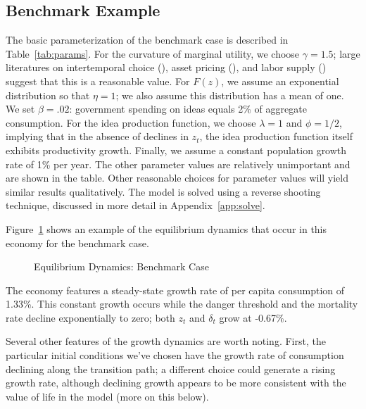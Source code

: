\documentclass[12pt,twoside]{article}
\newcommand{\cnp}[1]{(\citealt{#1})}  %
\begin{document}
\subsection{Benchmark Example}

The basic parameterization of the benchmark case is described in
Table~\ref{tab:params}. For the curvature of marginal utility, we choose
$\gamma=1.5$; large literatures on intertemporal choice \cnp{Hall:IES},
asset pricing \cnp{Lucas:risk}, and labor supply \cnp{Chetty2006}
suggest that this is a reasonable value. For $F(z)$, we assume an
exponential distribution so that $\eta=1$; we also assume this
distribution has a mean of one. We set $\beta=.02$: government spending
on ideas equals 2\% of aggregate consumption. For the idea production
function, we choose $\lambda=1$ and $\phi=1/2$, implying that in the
absence of declines in $z_t$, the idea production function itself
exhibits productivity growth. Finally, we assume a constant population
growth rate of 1\% per year. The other parameter values are relatively
unimportant and are shown in the table. Other reasonable choices for
parameter values will yield similar results qualitatively. The model is
solved using a reverse shooting technique, discussed in more detail in
Appendix~\ref{app:solve}.\hypertarget{APPB}{}

Figure~\ref{fig:dynamics} shows an example of the equilibrium dynamics
that occur in this economy for the benchmark case.
\begin{figure}[t!p]
\caption{Equilibrium Dynamics: Benchmark Case}
\label{fig:dynamics}
\end{figure} 
The economy features a steady-state growth rate of per capita
consumption of 1.33\%. This constant growth occurs while the danger
threshold and the mortality rate decline exponentially to zero; both
$z_t$ and $\delta_t$ grow at -0.67\%.

Several other features of the growth dynamics are worth noting. First,
the particular initial conditions we've chosen have the growth rate of
consumption declining along the transition path; a different choice
could generate a rising growth rate, although declining growth appears
to be more consistent with the value of life in the model (more on this
below).
\end{document}
